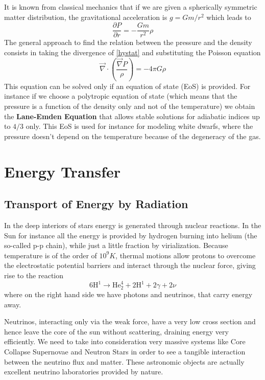 It is known from classical mechanics that if we are given a spherically symmetric matter distribution, the gravitational acceleration is $g=Gm/r^2$ which leads to
\begin{equation}\label{HydroEquilibrium}
	\frac{\partial P}{\partial r}= - \frac{G m}{r^2} \rho
\end{equation}
The general approach to find the relation between the pressure and the density consists in taking the divergence of \ref{hystat} and substituting the Poisson equation 
$$
\vec \nabla \cdot \left ( \frac{\vec \nabla P}{\rho} \right ) = - 4 \pi G \rho 
$$
This equation can be solved only if an equation of state (EoS) is provided. For instance if we choose a polytropic equation of state (which means that the pressure is a function of the density only and not of the temperature) we obtain the \textbf{Lane-Emden Equation} that allows stable solutions for adiabatic indices up to $4/3$ only. This EoS is used for instance for modeling white dwarfs, where the pressure doesn't depend on the temperature because of the degeneracy of the gas. 

\section{Energy Transfer}
\subsection{Transport of Energy by Radiation}
In the deep interiors of stars energy is generated through nuclear reactions. In the Sun for instance all the energy is provided by hydrogen burning into helium (the so-called p-p chain), while just a little fraction by virialization. Because temperature is of the order of $10^9 K$, thermal motions allow protons to overcome the electrostatic potential barriers and interact through the nuclear force, giving rise to the reaction
\begin{equation}\label{ppchain}
	6 \mathrm{H}^1 \to \mathrm{He}^4_2 + 2 \mathrm{H}^1 + 2 \gamma + 2 \nu
\end{equation}
where on the right hand side we have photons and neutrinos, that carry energy away. 

Neutrinos, interacting only via the weak force, have a very low cross section and hence leave the core of the sun without scattering, draining energy very efficiently. We need to take into consideration very massive systems like Core Collapse Supernovae and Neutron Stars in order to see a tangible interaction between the neutrino flux and matter. These astronomic objects are actually excellent neutrino laboratories provided by nature. 


